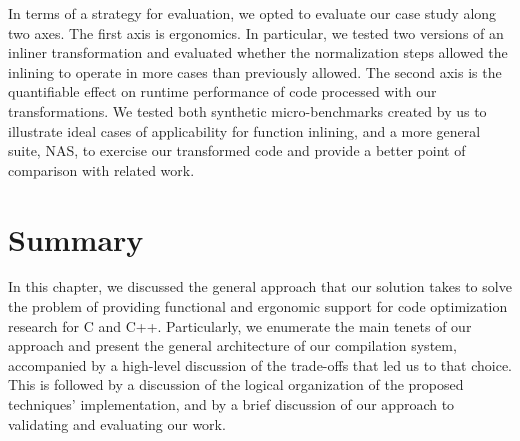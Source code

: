 In terms of a strategy for evaluation, we opted to evaluate our case study along two axes. The first axis is ergonomics. In particular, we tested two versions of an inliner transformation and evaluated whether the normalization steps allowed the inlining to operate in more cases than previously allowed. The second axis is the quantifiable effect on runtime performance of code processed with our transformations. We tested both synthetic micro-benchmarks created by us to illustrate ideal cases of applicability for function inlining, and a more general suite, NAS, to exercise our transformed code and provide a better point of comparison with related work.

\section{Summary}

In this chapter, we discussed the general approach that our solution takes to solve the problem of providing functional and ergonomic support for code optimization research for C and C++. Particularly, we enumerate the main tenets of our approach and present the general architecture of our compilation system, accompanied by a high-level discussion of the trade-offs that led us to that choice. This is followed by a discussion of the logical organization of the proposed techniques' implementation, and by a brief discussion of our approach to validating and evaluating our work.
